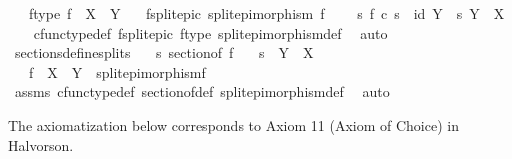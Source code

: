 \begin{isabellebody}
\ \ \ f{\isacharunderscore}{\kern0pt}type{\isacharcolon}{\kern0pt}\ {\isachardoublequoteopen}f\ {\isacharcolon}{\kern0pt}\ X\ {\isasymrightarrow}\ Y{\isachardoublequoteclose}\isanewline
\ \ \ f{\isacharunderscore}{\kern0pt}split{\isacharunderscore}{\kern0pt}epic{\isacharcolon}{\kern0pt}\ {\isachardoublequoteopen}split{\isacharunderscore}{\kern0pt}epimorphism\ f{\isachardoublequoteclose}\isanewline
\ \ \ {\isachardoublequoteopen}{\isasymexists}\ s{\isachardot}{\kern0pt}\ {\isacharparenleft}{\kern0pt}f\ {\isasymcirc}\isactrlsub c\ s\ {\isacharequal}{\kern0pt}\ id\ Y{\isacharparenright}{\kern0pt}\ {\isasymand}\ {\isacharparenleft}{\kern0pt}s{\isacharcolon}{\kern0pt}\ Y\ {\isasymrightarrow}\ X{\isacharparenright}{\kern0pt}{\isachardoublequoteclose}\isanewline
%
\isadelimproof
\ \ %
\endisadelimproof
%
\isatagproof
{}\isamarkupfalse%
\ cfunc{\isacharunderscore}{\kern0pt}type{\isacharunderscore}{\kern0pt}def\ f{\isacharunderscore}{\kern0pt}split{\isacharunderscore}{\kern0pt}epic\ f{\isacharunderscore}{\kern0pt}type\ split{\isacharunderscore}{\kern0pt}epimorphism{\isacharunderscore}{\kern0pt}def\ \isamarkupfalse%
\ auto%
\endisatagproof
{\isafoldproof}%
%
\isadelimproof
\isanewline
%
\endisadelimproof
\isanewline
{}\isamarkupfalse%
\ sections{\isacharunderscore}{\kern0pt}define{\isacharunderscore}{\kern0pt}splits{\isacharcolon}{\kern0pt}\isanewline
\ \ \ {\isachardoublequoteopen}s\ sectionof\ f{\isachardoublequoteclose}\isanewline
\ \ \ {\isachardoublequoteopen}s\ {\isacharcolon}{\kern0pt}\ Y\ {\isasymrightarrow}\ X{\isachardoublequoteclose}\isanewline
\ \ \ {\isachardoublequoteopen}f\ {\isacharcolon}{\kern0pt}\ X\ {\isasymrightarrow}\ Y\ {\isasymand}\ split{\isacharunderscore}{\kern0pt}epimorphism{\isacharparenleft}{\kern0pt}f{\isacharparenright}{\kern0pt}{\isachardoublequoteclose}\isanewline
%
\isadelimproof
\ \ %
\endisadelimproof
%
\isatagproof
{}\isamarkupfalse%
\ assms\ cfunc{\isacharunderscore}{\kern0pt}type{\isacharunderscore}{\kern0pt}def\ section{\isacharunderscore}{\kern0pt}of{\isacharunderscore}{\kern0pt}def\ split{\isacharunderscore}{\kern0pt}epimorphism{\isacharunderscore}{\kern0pt}def\ \isamarkupfalse%
\ auto%
\endisatagproof
{\isafoldproof}%
%
\isadelimproof
%
\endisadelimproof
%
\begin{isamarkuptext}%
The axiomatization below corresponds to Axiom 11 (Axiom of Choice) in Halvorson.%
\end{isamarkuptext}\isamarkuptrue%

\end{isabellebody}
